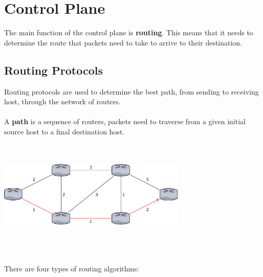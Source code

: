 \documentclass{article}
\begin{document}
\section{Control Plane}
The main function of the control plane is \textbf{routing}. This means that it needs to determine the route that packets need to take to arrive to their destination.

\subsection{Routing Protocols}
Routing protocols are used to determine the best path, from sending to receiving host, through the network of routers. \\ \\
A \textbf{path} is a sequence of routers, packets need to traverse from a given initial source host to a final destination host. \\ \\ \\
\centerline{\includegraphics[width=9cm]{./assets/graph.png}} \\ \\ \\
There are four types of routing algorithms:
\end{document}
